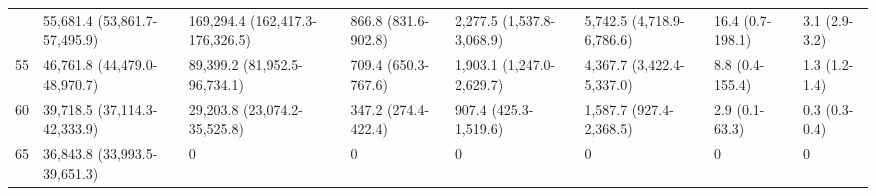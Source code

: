 \begin{table}
\begin{tabular}[t]{rlllllll}
\addlinespace
50 & 55,681.4 (53,861.7-57,495.9) & 169,294.4 (162,417.3-176,326.5) & 866.8 (831.6-902.8) & 2,277.5 (1,537.8-3,068.9) & 5,742.5 (4,718.9-6,786.6) & 16.4 (0.7-198.1) & 3.1 (2.9-3.2)\\
55 & 46,761.8 (44,479.0-48,970.7) & 89,399.2 (81,952.5-96,734.1) & 709.4 (650.3-767.6) & 1,903.1 (1,247.0-2,629.7) & 4,367.7 (3,422.4-5,337.0) & 8.8 (0.4-155.4) & 1.3 (1.2-1.4)\\
60 & 39,718.5 (37,114.3-42,333.9) & 29,203.8 (23,074.2-35,525.8) & 347.2 (274.4-422.4) & 907.4 (425.3-1,519.6) & 1,587.7 (927.4-2,368.5) & 2.9 (0.1-63.3) & 0.3 (0.3-0.4)\\
65 & 36,843.8 (33,993.5-39,651.3) & 0 & 0 & 0 & 0 & 0 & 0\\
\bottomrule
\end{tabular}
\end{table}